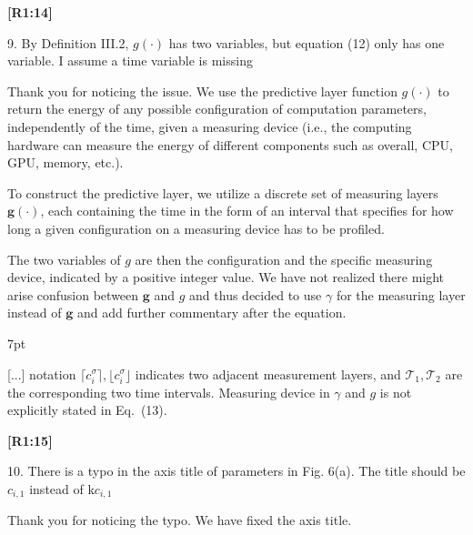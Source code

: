 \documentclass[10pt]{letter}
\newenvironment{formal}{%
  \def\FrameCommand{%
    \hspace{1pt}%
    {\color{red}\vrule width 2pt}%
    {\color{formalshade}\vrule width 4pt}%
    \colorbox{formalshade}%
  }%
  \MakeFramed{\advance\hsize-\width\FrameRestore}%
  \noindent\hspace{-4.55pt}%
  \begin{adjustwidth}{}{7pt}%
  \vspace{2pt}\vspace{2pt}%
}
{%
  \vspace{2pt}\end{adjustwidth}\endMakeFramed%
}
\begin{document}
{\hspace*{-4.5em}\textbf{[R1:14]}\vspace*{-1.9em}}

9. By Definition III.2, $g(\cdot)$ has two variables, but equation (12) only has one variable. I assume a time variable is missing

{\color{blue} 

{\hspace*{-4.5em}{[R1:14]}\vspace*{-1.9em}}

Thank you for noticing the issue. We use the predictive layer function $g(\cdot)$ to return the energy of any possible configuration of computation parameters, independently of the time, given a measuring device (i.e., the computing hardware can measure the energy of different components such as overall, CPU, GPU, memory, etc.). 

To construct the predictive layer, we utilize a discrete set of measuring layers $\mathbf{g}(\cdot)$, each containing the time in the form of an interval that specifies for how long a given configuration on a measuring device has to be profiled.

The two variables of $g$ are then the configuration and the specific measuring device, indicated by a positive integer value.
We have not realized there might arise confusion between $\mathbf{g}$ and $g$ and thus decided to use $\gamma$ for the measuring layer instead of $\mathbf{g}$ and add further commentary after the equation.

\begin{formal}
  \color{black}
  [...] notation $\lceil c_i^\sigma\rceil,\lfloor c_i^\sigma\rfloor$ indicates two adjacent measurement layers, and $\mathcal{T}_1,\mathcal{T}_2$ are the corresponding two time intervals. {\color{blue}M}easuring device in $\gamma$ and $g$ is {\color{blue}not explicitly stated in Eq.~({\color{red}13})}.
  \vspace*{1ex}
\end{formal}



}

{\hspace*{-4.5em}\textbf{[R1:15]}\vspace*{-1.9em}}

10. There is a typo in the axis title of parameters in Fig. 6(a). The title should be $c_{i,1}$ instead of k$c_{i,1}$

{\color{blue} 

{\hspace*{-4.5em}{[R1:15]}\vspace*{-1.9em}}

Thank you for noticing the typo. We have fixed the axis title.
}
\end{document}
